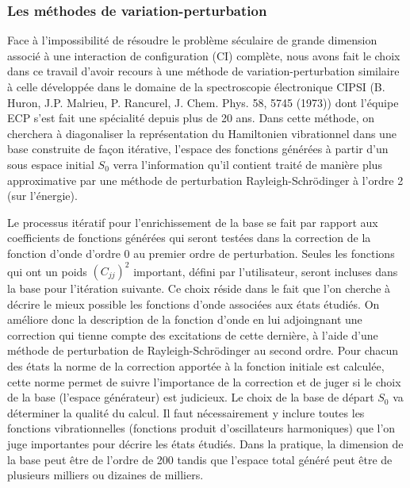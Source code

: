 \subsubsection{Les méthodes de variation-perturbation}


Face à l’impossibilité de résoudre le problème séculaire de grande dimension associé à une interaction de configuration (CI) complète, nous avons fait le choix dans  ce travail d’avoir recours à une méthode de variation-perturbation similaire à celle développée dans le domaine de la spectroscopie électronique CIPSI (B. Huron, J.P. Malrieu, P. Rancurel, J. Chem. Phys. 58, 5745 (1973)) dont l’équipe ECP s’est fait une spécialité depuis plus de 20 ans. Dans cette méthode, on cherchera à diagonaliser la représentation du Hamiltonien vibrationnel dans une base construite de façon itérative, l’espace des fonctions générées à partir d’un sous espace initial $S_0$ verra l’information qu’il contient traité de manière plus approximative par une méthode de perturbation Rayleigh-Schrödinger à l’ordre 2 (sur l’énergie).

Le processus itératif pour l’enrichissement de la base se fait par rapport aux coefficients de fonctions générées qui seront testées dans la correction de la fonction d’onde d’ordre 0 au premier ordre de perturbation. Seules les fonctions qui ont un poids $(C_{jj})^2$ important, défini par l’utilisateur, seront incluses dans la base pour l’itération suivante. 
Ce choix réside dans le fait que l’on cherche à décrire le mieux possible les fonctions d’onde associées aux états étudiés. On améliore donc la description de la fonction  d’onde en lui adjoingnant une correction qui tienne compte des excitations de cette dernière, à l’aide d’une méthode de perturbation de Rayleigh-Schrödinger au second ordre. Pour chacun des états la norme de la correction apportée à la fonction initiale est calculée, cette norme permet de suivre l’importance de la correction et de juger si le choix de la base (l’espace générateur) est judicieux. Le choix de la base de départ $S_0$ va déterminer la qualité du calcul. Il faut nécessairement y inclure toutes les fonctions vibrationnelles (fonctions produit d’oscillateurs harmoniques) que l’on juge importantes pour décrire les états étudiés. Dans la pratique, la dimension de la base peut être de l’ordre de 200 tandis que l’espace total généré peut être de plusieurs milliers ou dizaines de milliers.

